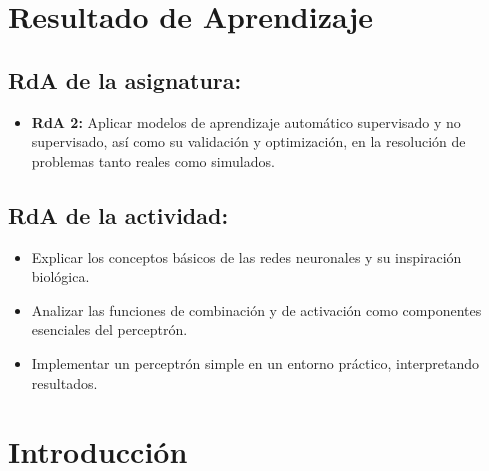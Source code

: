 \documentclass[a4,11pt]{aleph-notas}
\begin{document}
\encabezado


\section*{Resultado de Aprendizaje}

\subsection*{RdA de la asignatura:}
\begin{itemize}[leftmargin=*]
    \item \textbf
    {RdA 2:} Aplicar modelos de aprendizaje automático supervisado y no supervisado, así como su validación y optimización, en la resolución de problemas tanto reales como simulados.
\end{itemize}

\subsection*{RdA de la actividad:}
\begin{itemize}[leftmargin=*]
    \item Explicar los conceptos básicos de las redes neuronales y su inspiración biológica.
    \item Analizar las funciones de combinación y de activación como componentes esenciales del perceptrón.
    \item Implementar un perceptrón simple en un entorno práctico, interpretando resultados.
\end{itemize}

\section*{Introducción}
\end{document}
